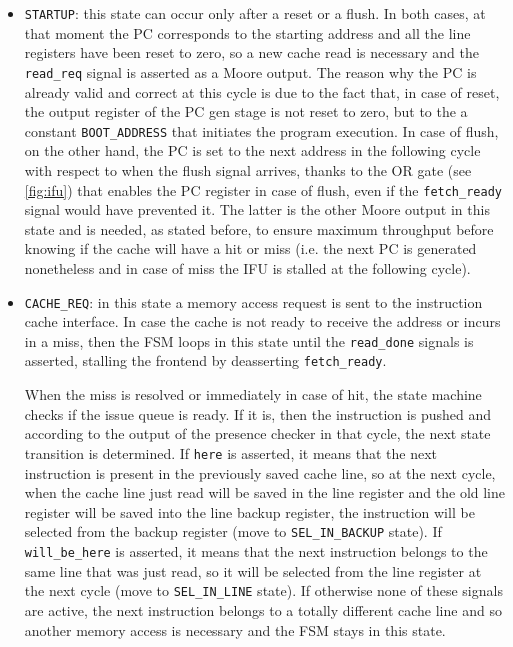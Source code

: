 \begin{itemize}
  \item \texttt{STARTUP}: this state can occur only after a reset or a flush. In both cases, at that moment the \ac{PC} corresponds to the starting address and all the line registers have been reset to zero, so a new cache read is necessary and the \texttt{read\_req} signal is asserted as a Moore output. The reason why the \ac{PC} is already valid and correct at this cycle is due to the fact that, in case of reset, the output register of the \ac{PC} gen stage is not reset to zero, but to the a constant \texttt{BOOT\_ADDRESS} that initiates the program execution. In case of flush, on the other hand, the \ac{PC} is set to the next address in the following cycle with respect to when the flush signal arrives, thanks to the OR gate (see \cref{fig:ifu}) that enables the \ac{PC} register in case of flush, even if the \texttt{fetch\_ready} signal would have prevented it. The latter is the other Moore output in this state and is needed, as stated before, to ensure maximum throughput before knowing if the cache will have a hit or miss (i.e. the next \ac{PC} is generated nonetheless and in case of miss the \ac{IFU} is stalled at the following cycle).
  \item \texttt{CACHE\_REQ}: in this state a memory access request is sent to the instruction cache interface. In case the cache is not ready to receive the address or incurs in a miss, then the \acs{FSM} loops in this state until the \texttt{read\_done} signals is asserted, stalling the frontend by deasserting \texttt{fetch\_ready}. 
  
  When the miss is resolved or immediately in case of hit, the state machine checks if the issue queue is ready. If it is, then the instruction is pushed and according to the output of the presence checker in that cycle, the next state transition is determined. If \texttt{here} is asserted, it means that the next instruction is present in the previously saved cache line, so at the next cycle, when the cache line just read will be saved in the line register and the old line register will be saved into the line backup register, the instruction will be selected from the backup register (move to \texttt{SEL\_IN\_BACKUP} state). If \texttt{will\_be\_here} is asserted, it means that the next instruction belongs to the same line that was just read, so it will be selected from the line register at the next cycle (move to \texttt{SEL\_IN\_LINE} state). If otherwise none of these signals are active, the next instruction belongs to a totally different cache line and so another memory access is necessary and the \acs{FSM} stays in this state.


\end{itemize}
